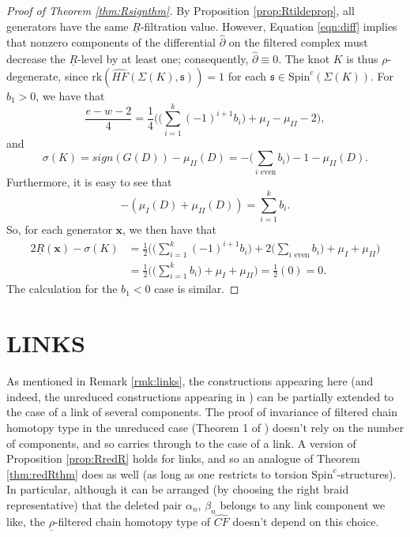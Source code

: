 \documentclass[11pt]{article}
\theoremstyle{plain} \newtheorem{thm}{Theorem}[subsection]
\theoremstyle{plain} \newtheorem{cor}[thm]{Corollary}
\theoremstyle{plain} \newtheorem{prop}[thm]{Proposition}
\theoremstyle{plain} \newtheorem{conj}[thm]{Conjecture}
\theoremstyle{plain} \newtheorem{lem}[thm]{Lemma}
\theoremstyle{definition} \newtheorem{df}[thm]{Definition}
\theoremstyle{remark} \newtheorem{rmk}[thm]{Remark}
\theoremstyle{remark} \newtheorem{obs}[thm]{Observation}
\newcommand{\DBC}[1]{\Sigma(#1)}
\newcommand{\red}[1]{\underline{#1}}
\newcommand{\bx}{\mathbf{x}}
\numberwithin{equation}{section}
\begin{document}
\begin{proof}[Proof of Theorem \ref{thm:Rsignthm}]
By Proposition \ref{prop:Rtildeprop}, all generators have the same $\red{R}$-filtration value.  However, Equation \ref{eqn:diff} implies that nonzero components of the differential $\widehat{\partial}$ on the filtered complex must decrease the $\red{R}$-level by at least one; consequently, $\widehat{\partial} \equiv 0$.  The knot $K$ is thus $\rho$-degenerate, since $\text{rk}\left( \widehat{HF}\left( \DBC{K}, \mathfrak{s}\right)\right) = 1$ for each $\mathfrak{s} \in \text{Spin}^{c}(\DBC{K})$.
For $b_{1}>0$, we have that
\begin{equation*}
\frac{e - w-2}{4} = \frac{1}{4}\Bigg( 
	\bigg(
		\displaystyle\sum_{i=1}^{k} (-1)^{i+1}b_{i}
	\bigg) 
	+ \mu_{I} - \mu_{II} - 2
\Bigg),
\end{equation*}
and
\begin{equation*}
\sigma(K) = sign(G(D)) - \mu_{II}(D) = -\Bigg(
	\displaystyle\sum_{i\text{ even}} b_{i}
\Bigg)- 1 - \mu_{II}(D).
\end{equation*}
Furthermore, it is easy to see that
\begin{equation*}
-(\mu_{I}(D) + \mu_{II}(D)) = \displaystyle\sum_{i = 1}^{k} b_{i}.
\end{equation*}
So, for each generator $\bx$, we then have that
\begin{align*}
 2\red{R}(\bx) - \sigma(K)& = \frac{1}{2} \Bigg( 
 	\bigg(
		\displaystyle\sum_{i=1}^{k} (-1)^{i+1}b_{i}
	\bigg)
	+2\bigg(
		\displaystyle\sum_{i \text{ even}}b_{i}
	\bigg)
	+ \mu_{I} + \mu_{II}
\Bigg)\\
&=  \frac{1}{2} \Bigg( 
 	\bigg(
		\displaystyle\sum_{i=1}^{k} b_{i}
	\bigg)
	+ \mu_{I} + \mu_{II}
\Bigg ) = \frac{1}{2}(0) = 0.
\end{align*}
The calculation for the $b_{1} <0$ case is similar.
\end{proof}

\section{LINKS}\label{sec:links}

As mentioned in Remark \ref{rmk:links}, the constructions appearing here (and indeed, the unreduced constructions appearing in \cite{et:R}) can be partially extended to the case of a link of several components.  The proof of invariance of filtered chain homotopy type in the unreduced case (Theorem 1 of \cite{et:R}) doesn't rely on the number of components, and so carries through to the case of a link.  A version of Proposition \ref{prop:RredR} holds for links, and so an analogue of Theorem \ref{thm:redRthm} does as well (as long as one restricts to torsion $\text{Spin}^c$-structures).  In particular, although it can be arranged (by choosing the right braid representative) that the deleted pair $\alpha_n$, $\beta_n$ belongs to any link component we like, the $\red{\rho}$-filtered chain homotopy type of $\widehat{CF}$ doesn't depend on this choice.
\end{document}
